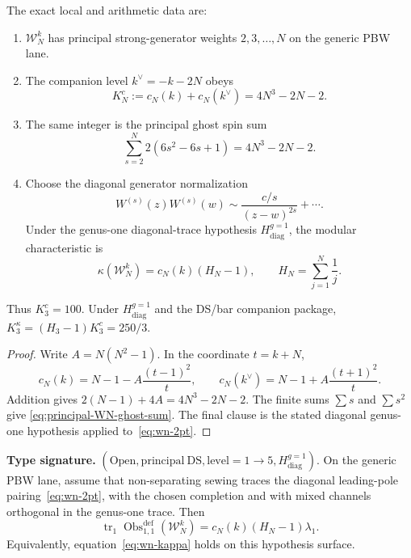 \begin{proposition}
\label{prop:principal-WN-standard-family-ledger}
The exact local and arithmetic data are:
\begin{enumerate}[label=\textup{(\roman*)}]
\item $\mathcal W_N^k$ has principal strong-generator weights
$2,3,\ldots,N$ on the generic PBW lane.
\item The companion level $k^\vee=-k-2N$ obeys
\begin{equation}\label{eq:principal-WN-conductor}
K_N^c:=c_N(k)+c_N(k^\vee)=4N^3-2N-2.
\end{equation}
\item The same integer is the principal ghost spin sum
\begin{equation}\label{eq:principal-WN-ghost-sum}
\sum_{s=2}^N2(6s^2-6s+1)=4N^3-2N-2.
\end{equation}
\item Choose the diagonal generator normalization
\begin{equation}\label{eq:wn-2pt}
W^{(s)}(z)W^{(s)}(w)\sim
\frac{c/s}{(z-w)^{2s}}+\cdots.
\end{equation}
Under the genus-one diagonal-trace hypothesis
$H_{\mathrm{diag}}^{g=1}$, the modular characteristic is
\begin{equation}\label{eq:wn-kappa}
\kappa(\mathcal W_N^k)=c_N(k)(H_N-1),
\qquad H_N=\sum_{j=1}^N\frac1j.
\end{equation}
\end{enumerate}
Thus $K_3^c=100$.  Under $H_{\mathrm{diag}}^{g=1}$ and the
DS/bar companion package,
$K_3^\kappa=(H_3-1)K_3^c=250/3$.
\end{proposition}

\begin{proof}
Write $A=N(N^2-1)$.  In the coordinate $t=k+N$,
\[
c_N(k)=N-1-A\frac{(t-1)^2}{t},\qquad
c_N(k^\vee)=N-1+A\frac{(t+1)^2}{t}.
\]
Addition gives $2(N-1)+4A=4N^3-2N-2$.  The finite sums
$\sum s$ and $\sum s^2$ give
\eqref{eq:principal-WN-ghost-sum}.  The final clause is the stated
diagonal genus-one hypothesis applied to~\eqref{eq:wn-2pt}.
\end{proof}

\begin{theorem}
\label{thm:wn-obstruction}
\textbf{Type signature.}
$(\mathrm{Open},\mathrm{principal\ DS},\mathrm{level}=1\to5,
H_{\mathrm{diag}}^{g=1})$.
On the generic PBW lane, assume that non-separating sewing traces the
diagonal leading-pole pairing~\eqref{eq:wn-2pt}, with the chosen
completion and with mixed channels orthogonal in the genus-one trace.
Then
\[
\operatorname{tr}_1\operatorname{Obs}^{\mathrm{def}}_{1,1}(\mathcal W_N^k)
=c_N(k)(H_N-1)\lambda_1.
\]
Equivalently, equation~\eqref{eq:wn-kappa} holds on this hypothesis
surface.
\end{theorem}

